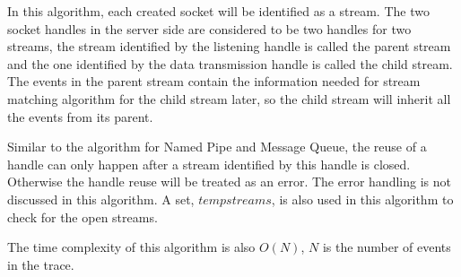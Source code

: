\documentclass[12pt,oneside]{book}
\begin{document}
In this algorithm, each created socket will be identified as a stream. The two socket handles in the server side are considered to be two handles for two streams, the stream identified by the listening handle is called the parent stream and the one identified by the data transmission handle is called the child stream. The events in the parent stream contain the information needed for stream matching algorithm for the child stream later, so the child stream will inherit all the events from its parent. 

Similar to the algorithm for Named Pipe and Message Queue, the reuse of a handle can only happen after a stream identified by this handle is closed. Otherwise the handle reuse will be treated as an error. The error handling is not discussed in this algorithm. A set, $tempstreams$, is also used in this algorithm to check for the open streams.

The time complexity of this algorithm is also $O(N)$, $N$ is the number of events in the trace.
\end{document}

